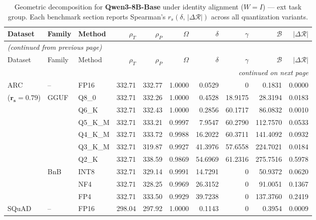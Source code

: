 \begingroup
\small
\setlength{\tabcolsep}{4pt}
\renewcommand{\arraystretch}{1.05}
\setlength{\LTcapwidth}{\textwidth}
\begin{longtable}{ll l rrrrrrr}
\caption{Geometric decomposition for \textbf{Qwen3-8B-Base} under identity alignment ($W{=}I$) --- ext task group. Each benchmark section reports Spearman's $r_s(\delta,\,|\Delta\mathcal{R}|)$ across all quantization variants.}\label{tab:qwen_decomposition_ext}\\
\toprule
Dataset & Family & Method & $\rho_T$ & $\rho_P$ & $\Omega$ & $\delta$ & $\gamma$ & $\mathcal{B}$ & $|\Delta\mathcal{R}|$ \\
\midrule
\endfirsthead
\multicolumn{10}{l}{\small\itshape (continued from previous page)}\\
\toprule
Dataset & Family & Method & $\rho_T$ & $\rho_P$ & $\Omega$ & $\delta$ & $\gamma$ & $\mathcal{B}$ & $|\Delta\mathcal{R}|$ \\
\midrule
\endhead
\midrule
\multicolumn{10}{r}{\small\itshape continued on next page}\\
\endfoot
\bottomrule
\endlastfoot
ARC & -- & FP16 & 332.71 & 332.77 & 1.0000 & 0.0529 & \cellcolor{cyan!12} $0$ & 0.1831 & 0.0000 \\
{\small ($\mathbf{r_s{=}0.79}$)} & GGUF & Q8\_0 & 332.71 & 332.26 & 1.0000 & 0.4528 & 18.9175 & 28.3194 & 0.0183 \\
 &  & Q6\_K & 332.71 & 332.43 & 1.0000 & 0.2856 & 60.1717 & 86.0832 & 0.0010 \\
 &  & Q5\_K\_M & 332.71 & 333.21 & 0.9997 & 7.9547 & 60.2790 & 112.7570 & 0.0533 \\
 &  & Q4\_K\_M & 332.71 & 333.72 & 0.9988 & 16.2022 & 60.3711 & 141.4092 & 0.0932 \\
 &  & Q3\_K\_M & 332.71 & 319.87 & 0.9927 & 41.3976 & 57.6558 & 224.7021 & 0.0184 \\
 &  & Q2\_K & 332.71 & 338.59 & 0.9869 & 54.6969 & 61.2316 & 275.7516 & 0.5978 \\
 & BnB & INT8 & 332.71 & 329.14 & 0.9991 & 14.7291 & \cellcolor{cyan!12} $0$ & 50.9372 & 0.0620 \\
 &  & NF4 & 332.71 & 328.25 & 0.9969 & 26.3152 & \cellcolor{cyan!12} $0$ & 91.0051 & 0.1367 \\
 &  & FP4 & 332.71 & 333.50 & 0.9929 & 39.7238 & \cellcolor{cyan!12} $0$ & 137.3760 & 0.2419 \\
\midrule
SQuAD & -- & FP16 & 298.04 & 297.92 & 1.0000 & 0.1143 & \cellcolor{cyan!12} $0$ & 0.3954 & 0.0009 \\

\end{longtable}
